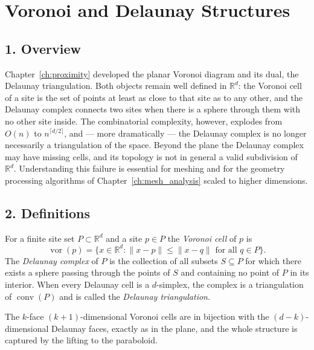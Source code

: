 \section{Voronoi and Delaunay Structures}
\label{sec:highdim_voronoi_delaunay}

\subsection{1. Overview}

Chapter~\ref{ch:proximity} developed the planar Voronoi diagram and its dual,
the Delaunay triangulation. Both objects remain well defined in
$\mathbb{R}^d$: the Voronoi cell of a site is the set of points at least as
close to that site as to any other, and the Delaunay complex connects two
sites when there is a sphere through them with no other site inside. The
combinatorial complexity, however, explodes from $O(n)$ to
$n^{\lceil d/2 \rceil}$, and --- more dramatically --- the Delaunay complex is
no longer necessarily a triangulation of the space. Beyond the plane the
Delaunay complex may have missing cells, and its topology is not in general a
 valid subdivision of $\mathbb{R}^d$. Understanding this failure is essential
 for meshing and for the geometry processing algorithms of
 Chapter~\ref{ch:mesh_analysis} scaled to higher dimensions.

\subsection{2. Definitions}

\begin{definition}
\label{def:highdim_voronoi}
For a finite site set $P \subset \mathbb{R}^d$ and a site $p \in P$ the
\emph{Voronoi cell} of $p$ is
\[
\operatorname{vor}(p) = \{ x \in \mathbb{R}^d : \|x - p\| \le \|x - q\| \text{ for all } q \in P \}.
\]
The \emph{Delaunay complex} of $P$ is the collection of all subsets
$S \subseteq P$ for which there exists a sphere passing through the points of
$S$ and containing no point of $P$ in its interior. When every Delaunay cell
is a $d$-simplex, the complex is a triangulation of
$\operatorname{conv}(P)$ and is called the \emph{Delaunay triangulation}.
\end{definition}

The $k$-face $(k+1)$-dimensional Voronoi cells are in bijection with the
$(d-k)$-dimensional Delaunay faces, exactly as in the plane, and the whole
structure is captured by the lifting to the paraboloid.

